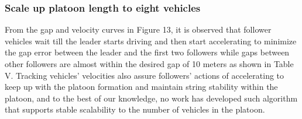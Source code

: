 \subsubsection{Scale up platoon length to eight vehicles}
From the gap and velocity curves in Figure 13, it is observed that follower vehicles wait till the leader starts driving and then start accelerating to minimize the gap error between the leader and the first two followers while gaps between other followers are almost within the desired gap of 10 meters as shown in Table V. Tracking vehicles' velocities also assure followers' actions of accelerating to keep up with the platoon formation and maintain string stability within the platoon, and to the best of our knowledge, no work has developed such algorithm that supports stable scalability to the number of vehicles in the platoon.

